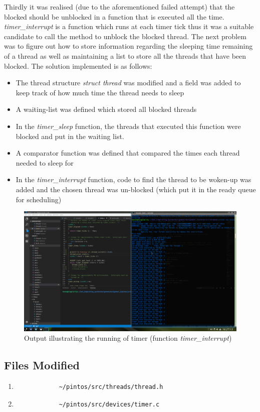 \documentclass[]{article}
\begin{document}
		Thirdly it was realised (due to the aforementioned failed attempt) that the blocked should be unblocked in a function that is executed all the time. \textit{timer\_interrupt} is a function which runs at each timer tick thus it was a suitable candidate to call the method to unblock the blocked thread. The next problem was to figure out how to store information regarding the sleeping time remaining of a thread as well as maintaining a list to store all the threads that have been blocked. The solution implemented is as follows:
		\begin{itemize}
			\item The thread structure \textit{struct thread} was modified and a field was added to keep track of how much time the thread needs to sleep
			\item A waiting-list was defined which stored all blocked threads
			\item In the \textit{timer\_sleep} function, the threads that executed this function were blocked and put in the waiting list.
			\item A comparator function was defined that compared the times each thread needed to sleep for
			\item In the \textit{timer\_interrupt} function, code to find the thread to be woken-up was added and the chosen thread was un-blocked (which put it in the ready queue for scheduling)
		\end{itemize}
		\begin{figure}[H]
			\centering
			\includegraphics[scale=0.3]{"OutputInterruptPrints1"}
			\caption{Output illustrating the running of timer (function \textit{timer\_interrupt})}
		\end{figure}
	\subsection{Files Modified}
		\begin{enumerate}
				\item \begin{verbatim}
			~/pintos/src/threads/thread.h 
			\end{verbatim}
			\item \begin{verbatim}
			~/pintos/src/devices/timer.c
			\end{verbatim}
		\end{enumerate}	
\end{document}
